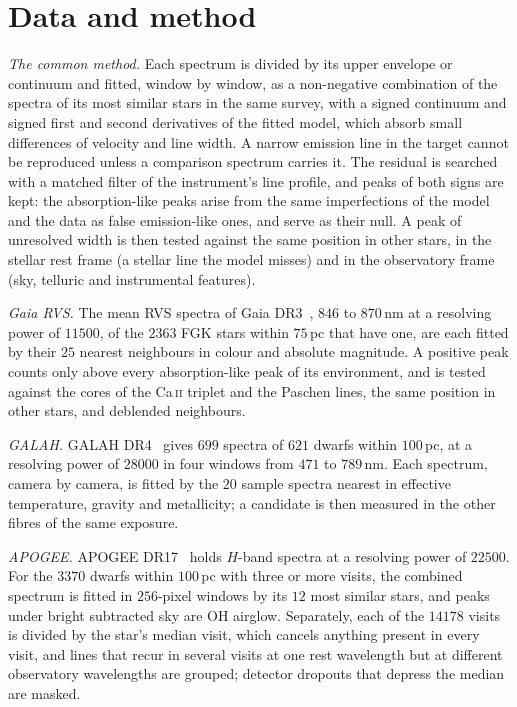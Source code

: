 \documentclass[3p,11pt]{elsarticle}
\newcommand{\ion}[2]{#1\,\textsc{#2}}
\begin{document}
\section{Data and method}\label{sec:method}

\emph{The common method.} Each spectrum is divided by its upper envelope or continuum and
fitted, window by window, as a non-negative combination of the spectra of its most
similar stars in the same survey, with a signed continuum and signed first and second
derivatives of the fitted model, which absorb small differences of velocity and line
width. A narrow emission line in the target cannot be reproduced unless a comparison
spectrum carries it. The residual is searched with a matched filter of the instrument's
line profile, and peaks of both signs are kept: the absorption-like peaks arise from the
same imperfections of the model and the data as false emission-like ones, and serve as
their null. A peak of unresolved width is then
tested against the same position in other stars, in the stellar rest frame (a stellar
line the model misses) and in the observatory frame (sky, telluric and instrumental
features).

\emph{Gaia RVS.} The mean RVS spectra of Gaia DR3~\cite{Gaia2023,Katz2023}, $846$ to
$870$\,nm at a resolving power of $11500$, of the $2363$ FGK stars within $75$\,pc that
have one, are each fitted by their $25$ nearest neighbours in colour and absolute
magnitude. A positive peak counts only above every absorption-like peak of its
environment, and is tested against the cores of the \ion{Ca}{ii} triplet and the Paschen
lines, the same position in other stars, and deblended neighbours.

\emph{GALAH.} GALAH DR4~\cite{Buder2024} gives $699$ spectra of $621$ dwarfs within
$100$\,pc, at a resolving power of $28000$ in four windows from $471$ to $789$\,nm. Each
spectrum, camera by camera, is fitted by the $20$ sample spectra nearest in effective
temperature, gravity and metallicity; a candidate is then measured in the other fibres of
the same exposure.

\emph{APOGEE.} APOGEE DR17~\cite{Majewski2017,Abdurrouf2022} holds $H$-band spectra at a
resolving power of $22500$. For the $3370$ dwarfs within $100$\,pc with three or more
visits, the combined spectrum is fitted in $256$-pixel windows by its $12$ most similar
stars, and peaks under bright subtracted sky are OH airglow. Separately, each of the
$14178$ visits is divided by the star's median visit, which cancels anything present in
every visit, and lines that recur in several visits at one rest wavelength but at
different observatory wavelengths are grouped; detector dropouts that depress the median
are masked.
\end{document}
